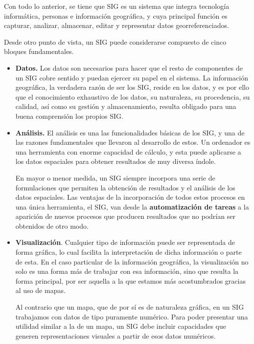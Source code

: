 Con todo lo anterior, se tiene que SIG es un sistema que integra tecnología informática, personas e información geográfica, y cuya principal función es capturar, analizar, almacenar, editar y representar datos georreferenciados. 

Desde otro punto de vista, un SIG puede considerarse compuesto de cinco bloques fundamentales.

\begin{itemize}
 \item \textbf{Datos.} Los datos son necesarios para hacer que el resto de componentes de un SIG cobre sentido y puedan ejercer su papel en el sistema. La información geográfica, la verdadera razón de ser los SIG, reside en los datos, y es por ello que el conocimiento exhaustivo de los datos, su naturaleza, su procedencia, su calidad, así como su gestión y almacenamiento, resulta obligado para una buena comprensión los propios SIG.

\item \textbf{Análisis.} El análisis es una las funcionalidades básicas de los SIG, y una de las razones fundamentales que llevaron al desarrollo de estos. Un ordenador es una herramienta con enorme capacidad de cálculo, y esta puede aplicarse a los datos espaciales para obtener resultados de muy diversa índole.

En mayor o menor medida, un SIG siempre incorpora una serie de formulaciones que permiten la obtención de resultados y el análisis de los datos espaciales. Las ventajas de la incorporación de todos estos procesos en una única herramienta, el SIG, van desde la \textbf{automatización de tareas} a la aparición de nuevos procesos que producen resultados que no podrían ser obtenidos de otro modo. 

\item \textbf{Visualización}. Cualquier tipo de información puede ser representada de forma gráfica, lo cual facilita la interpretación de dicha información o parte de esta. En el caso particular de la información geográfica, la visualización no solo es una forma más de trabajar con esa información, sino que resulta la forma principal, por ser aquella a la que estamos más acostumbrados gracias al uso de mapas.

Al contrario que un mapa, que de por sí es de naturaleza gráfica, en un SIG trabajamos con datos de tipo puramente numérico. Para poder presentar una utilidad similar a la de un mapa, un SIG debe incluir capacidades que generen representaciones visuales a partir de esos datos numéricos.


\end{itemize}
